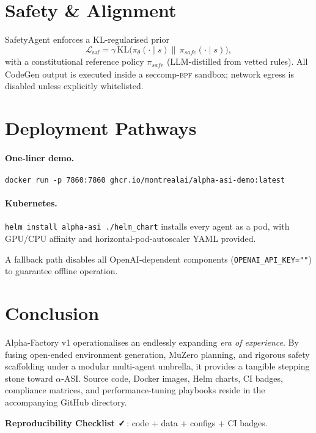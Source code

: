 \documentclass[11pt]{article}
\begin{document}
\section{Safety \& Alignment}\label{sec:safety}

SafetyAgent enforces a KL-regularised prior
\[
\mathcal{L}_{\text{saf}}
  = \gamma\,\mathrm{KL}\!\bigl(
      \pi_\theta(\cdot\!\mid\!s)
      \big\|\,
      \pi_{\textit{safe}}(\cdot\!\mid\!s)
    \bigr),
\]
with a constitutional reference policy $\pi_{\textit{safe}}$
(LLM-distilled from vetted rules).  All CodeGen output is executed inside a
seccomp-\textsc{bpf} sandbox; network egress is disabled unless explicitly whitelisted.

\section{Deployment Pathways}

\paragraph{One-liner demo.}
\begin{verbatim}
docker run -p 7860:7860 ghcr.io/montrealai/alpha-asi-demo:latest
\end{verbatim}

\paragraph{Kubernetes.}
\verb|helm install alpha-asi ./helm_chart| installs every agent as a pod, with
GPU/CPU affinity and horizontal-pod-autoscaler YAML provided.

A fallback path disables all OpenAI-dependent components
(\texttt{OPENAI\_API\_KEY=""}) to guarantee offline operation.

\section{Conclusion}

\noindent
Alpha-Factory v1 operationalises an endlessly expanding \emph{era of
experience}.  By fusing open-ended environment generation, MuZero planning,
and rigorous safety scaffolding under a modular multi-agent umbrella, it
provides a tangible stepping stone toward $\alpha$-ASI.  Source code, Docker
images, Helm charts, CI badges, compliance matrices, and performance-tuning
playbooks reside in the accompanying GitHub directory.

\medskip\noindent
\textbf{Reproducibility Checklist ✓}\,: code + data + configs + CI badges.
\end{document}
